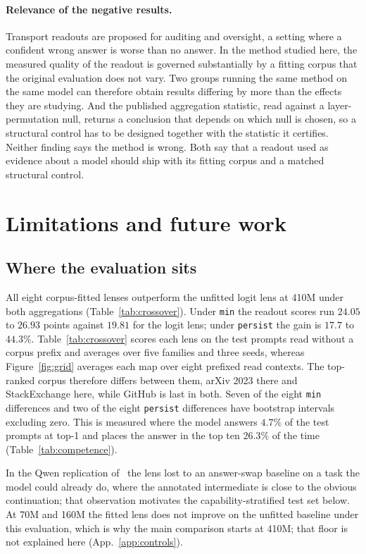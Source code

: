 \documentclass{article}
\newcommand{\mn}{\texttt{min}}
\newcommand{\pe}{\texttt{persist}}
\begin{document}
\paragraph{Relevance of the negative results.} Transport readouts are proposed
for auditing and oversight, a setting where a confident wrong answer is worse than no answer. In the method studied here, the measured quality of the readout is governed substantially by a
fitting corpus that the original evaluation does not vary. Two groups running the same method
on the same model can therefore obtain results differing by more than the effects they are studying. And the published aggregation
statistic, read against a layer-permutation null, returns a conclusion that depends on which null is chosen, so a structural control has to be designed together with the statistic it certifies.
Neither finding says the method is wrong. Both say that a readout used as evidence about a model should ship with its fitting corpus and a
matched structural control.

\section{Limitations and future work}
\label{app:limits}

\subsection{Where the evaluation sits}

All eight corpus-fitted lenses outperform the unfitted logit lens at 410M under both aggregations
(Table~\ref{tab:crossover}). Under \mn{} the readout scores run $24.05$ to $26.93$ points against
$19.81$ for the logit lens; under \pe{} the gain is $17.7$ to $44.3\%$. Table~\ref{tab:crossover}
scores each lens on the test prompts read without a corpus prefix and averages over five families and
three seeds, whereas Figure~\ref{fig:grid} averages each map over eight prefixed read contexts. The top-ranked
corpus therefore differs between them, arXiv 2023 there and StackExchange here, while GitHub is
last in both. Seven of the eight \mn{}
differences and two of the eight \pe{} differences have bootstrap intervals excluding zero. This is
measured where the model answers $4.7\%$ of the test prompts at top-1 and places the answer in the top
ten $26.3\%$ of the time (Table~\ref{tab:competence}).

In the Qwen replication of~\citet{nanda2026review} the lens lost to an answer-swap baseline on a
task the model could already do, where the annotated intermediate is close to the obvious
continuation; that observation motivates the capability-stratified test set below. At 70M and 160M
the fitted lens does not improve on the unfitted baseline under this evaluation, which is why the
main comparison starts at 410M; that floor is not explained here (App.~\ref{app:controls}).
\end{document}
